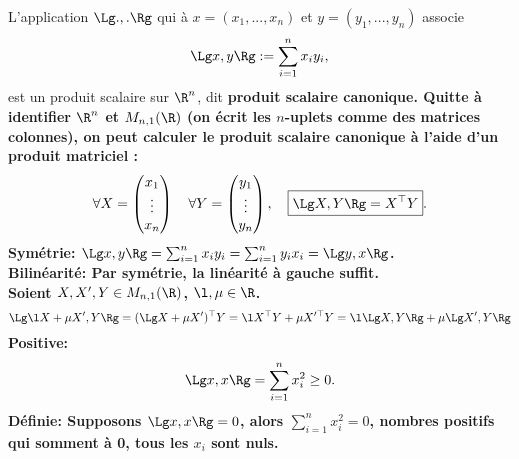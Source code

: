 \documentclass[11pt]{article}
\begin{document}
\begin{prop}{}{}
    L'application $\Lg.,.\Rg$ qui à $x=(x_1,...,x_n)$ et $y=(y_1,...,y_n)$ associe
    \begin{equation*}
        \Lg x,y\Rg := \sum_{i=1}^nx_iy_i,
    \end{equation*}
    est un produit scalaire sur $\R^n$, dit \bf{produit scalaire canonique.}\n
    Quitte à identifier $\R^n$ et $M_{n,1}(\R)$ (on écrit les $n$-uplets comme des matrices colonnes), on peut calculer le produit scalaire canonique à l'aide d'un produit matriciel :
    \begin{equation*}
        \forall X = \begin{pmatrix} x_1 \\ \vdots \\ x_n \end{pmatrix} \quad \forall Y = \begin{pmatrix} y_1 \\ \vdots \\ y_n \end{pmatrix}, \quad \boxed{\Lg X, Y \Rg = X^\top Y}.
    \end{equation*}
    \tcblower
    \bf{Symétrie:} $\Lg x, y \Rg = \sum_{i=1}^nx_iy_i=\sum_{i=1}^ny_ix_i=\Lg y, x\Rg$.\\
    \bf{Bilinéarité:} Par symétrie, la linéarité à gauche suffit.\\
    Soient $X,X',Y\in M_{n,1}(\R)$, $\l,\mu\in\R$.
    \begin{equation*}
        \Lg \l X + \mu X', Y \Rg = (\Lg X + \mu X')^{\top}Y=\l X^{\top}Y + \mu X'^{\top}Y=\l\Lg X,Y \Rg + \mu \Lg X', Y \Rg
    \end{equation*}
    \bf{Positive:}
    \begin{equation*}
        \Lg x, x \Rg = \sum_{i=1}^nx_i^2\geq0.
    \end{equation*}
    \bf{Définie:}
    Supposons $\Lg x,x \Rg=0$, alors $\sum_{i=1}^nx_i^2=0$, nombres positifs qui somment à 0, tous les $x_i$ sont nuls.
\end{prop}
\end{document}
